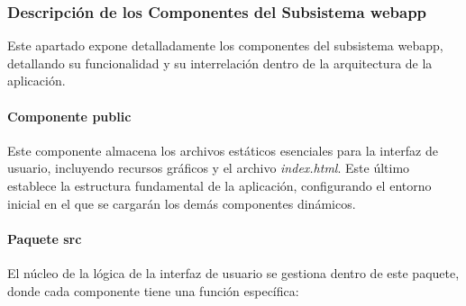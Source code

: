\subsubsection{Descripción de los Componentes del Subsistema webapp}

Este apartado expone detalladamente los componentes del subsistema webapp, detallando su funcionalidad y su interrelación dentro de la arquitectura de la aplicación.

\paragraph{Componente \textbf{public}}
Este componente almacena los archivos estáticos esenciales para la interfaz de usuario, incluyendo recursos gráficos y el archivo \textit{index.html}. Este último establece la estructura fundamental de la aplicación, configurando el entorno inicial en el que se cargarán los demás componentes dinámicos.

\paragraph{Paquete \textbf{src}}
El núcleo de la lógica de la interfaz de usuario se gestiona dentro de este paquete, donde cada componente tiene una función específica:


